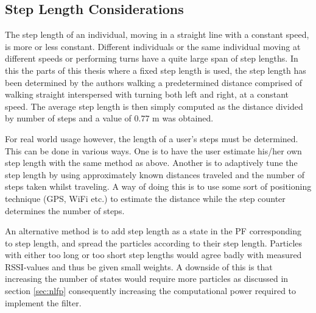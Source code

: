\documentclass{LTHthesis}
\begin{document}
\subsection{Step Length Considerations}
\label{subsec:step_len}
%
The step length of an individual, moving in a straight line with a constant speed, is more or less constant. Different individuals or the same individual moving at different speeds or performing turns have a quite large span of step lengths. In this the parts of this thesis where a fixed step length is used, the step length has been determined by the authors walking a predetermined distance comprised of walking straight interspersed with turning both left and right, at a constant speed. The average step length is then simply computed as the distance divided by number of steps and a value of $0.77$ m was obtained.  

For real world usage however, the length of a user's steps must be determined. This can be done in various ways. One is to have the user estimate his/her own step length with the same method as above. Another is to adaptively tune the step length by using approximately known distances traveled and the number of steps taken whilst traveling. A way of doing this is to use some sort of positioning technique (GPS, WiFi etc.) to estimate the distance while the step counter determines the number of steps.

An alternative method is to add step length as a state in the PF corresponding to step length, and spread the particles according to their step length. Particles with either too long or too short step lengths would agree badly with measured RSSI-values and thus be given small weights. A downside of this is that increasing the number of states would require more particles as discussed in section \ref{sec:nlfp} consequently increasing the computational power required to implement the filter.      
%
\end{document}
